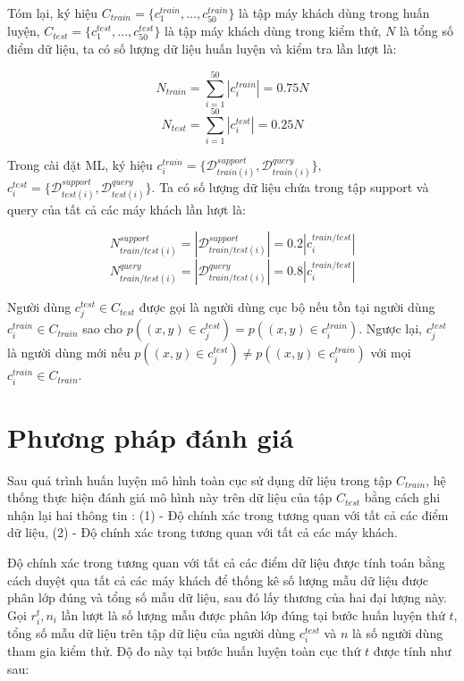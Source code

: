 Tóm lại, ký hiệu $C_{train} = \{c^{train}_1,...,c^{train}_{50}\}$ là tập máy khách dùng trong huấn luyện, $C_{test} = \{c^{test}_1,...,c^{test}_{50}\}$ là tập máy khách dùng trong kiểm thử, $N$ là tổng số điểm dữ liệu, ta có số lượng dữ liệu huấn luyện và kiểm tra lần lượt là:

\begin{equation*}
    N_{train} = \sum_{i=1}^{50} \left|c^{train}_i\right| = 0.75N
\end{equation*}
\begin{equation*}
    N_{test} = \sum_{i=1}^{50} \left|c^{test}_i\right| = 0.25N
\end{equation*}

Trong cài đặt ML, ký hiệu $c^{train}_i = \{\mathcal{D}_{train(i)}^{support}, \mathcal{D}_{train(i)}^{query}\}$, $ c^{test}_i = \{\mathcal{D}_{test(i)}^{support}, \mathcal{D}_{test(i)}^{query}\}$. Ta có số lượng dữ liệu chứa trong tập support và query của tất cả các máy khách lần lượt là:

\begin{equation*}
    N_{train/test(i)}^{support} = \left|\mathcal{D}_{train/test(i)}^{support}\right| = 0.2 \left|c_i^{train/test}\right|
\end{equation*}
\begin{equation*}
    N_{train/test(i)}^{query} = \left|\mathcal{D}_{train/test(i)}^{query}\right| = 0.8 \left|c^{train/test}_i\right|
\end{equation*}

Người dùng $c_j^{test} \in C_{test}$ được gọi là người dùng cục bộ nếu tồn tại người dùng $c_i^{train}\in C_{train}$ sao cho $p\left((x,y)\in c_j^{test}\right) = p\left((x,y)\in c_i^{train}\right)$. Ngược lại, $c_j^{test}$ là người dùng mới nếu $p\left((x,y)\in c_j^{test}\right) \ne p\left((x,y)\in c_i^{train}\right)$ với mọi $c_i^{train}\in C_{train}$.

\section{Phương pháp đánh giá}

Sau quá trình huấn luyện mô hình toàn cục sử dụng dữ liệu trong tập $C_{train}$, hệ thống thực hiện đánh giá mô hình này trên dữ liệu của tập $C_{test}$ bằng cách ghi nhận lại hai thông tin \cite{chen2018federated}: (1) - Độ chính xác trong tương quan với tất cả các điểm dữ liệu, (2) - Độ chính xác trong tương quan với tất cả các máy khách.

Độ chính xác trong tương quan với tất cả các điểm dữ liệu được tính toán bằng cách duyệt qua tất cả các máy khách để thống kê số lượng mẫu dữ liệu được phân lớp đúng và tổng số mẫu dữ liệu, sau đó lấy thương của hai đại lượng này. Gọi $r_i^t, n_i$ lần lượt là số lượng mẫu được phân lớp đúng tại bước huấn luyện thứ $t$, tổng số mẫu dữ liệu trên tập dữ liệu của người dùng $c_i^{test}$ và $n$ là số người dùng tham gia kiểm thử. Độ đo này tại bước huấn luyện toàn cục thứ $t$ được tính như sau:

